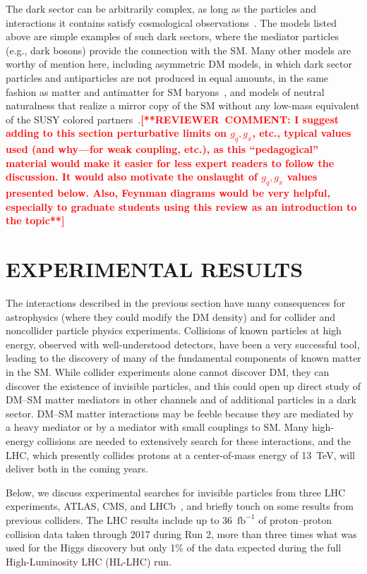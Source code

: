 \documentclass{ar-1col}
\newcommand{\IP}{invisible particle}
\newcommand{\ifb}{\ensuremath{\mathrm{fb}^{-1}}\xspace}
\begin{document}
The dark sector can be arbitrarily complex, as long as the
particles and interactions it contains satisfy cosmological
observations~\cite{Strassler:2006im, Evans:2017kti}. The models
listed above are simple examples of such dark sectors, where the
mediator particles (e.g., dark bosons) provide the connection with
the SM. Many other models are worthy of mention here, including
asymmetric DM models, in which dark sector particles and
antiparticles are not produced in equal amounts, in the same
fashion as matter and antimatter for SM
baryons~\cite{Zurek:2013wia}, and models of neutral
naturalness that realize a mirror copy of the SM without any
low-mass equivalent of the SUSY colored
partners~\cite{Craig:2014aea}.\textbf{\textcolor{red}{[**REVIEWER\ COMMENT: I suggest adding to this section perturbative limits on $g_q, g_x$, etc., typical values used (and why---for weak coupling, etc.), as this ``pedagogical'' material would make it easier for less expert readers to follow the discussion. It would also motivate the onslaught of $g_q, g_x$ values presented below. Also, Feynman diagrams would be very helpful, especially to graduate students using this review as an introduction to the topic**]}}

\section{EXPERIMENTAL RESULTS}\label{sec:03_ExperimentalResults}

The interactions described in the previous section have many
consequences for astrophysics (where they could modify the DM
density) and for collider and noncollider particle physics
experiments.
Collisions of known particles at high energy, observed with
well-understood detectors, have been a very successful tool,
leading to the discovery of many of the fundamental components of
known matter in the SM. While collider experiments alone cannot
discover DM, they can discover {the existence of \IP}s, and this could open up
direct study of DM--SM matter mediators in other channels and of
additional particles in a dark sector. DM--SM matter interactions may be
feeble because they are mediated by a heavy mediator or by a
mediator with small couplings to SM. Many high-energy collisions are needed to extensively search for these interactions, and the
LHC, which presently collides protons at a center-of-mass energy
of 13~TeV, will deliver both in the coming years.

Below, we discuss experimental searches for {\IP}s from three
LHC~\cite{LHC2008} experiments, ATLAS, CMS, and
LHCb~\cite{ATLAS2008,CMS2008,LHCb2008}, and briefly touch on some
results from previous colliders. The LHC results include up to
36~\ifb of proton--proton collision data taken through 2017 during Run 2,
more than three times what was used for the Higgs discovery but only
1\% of the data expected during the full High-Luminosity LHC (HL-LHC)
run.
\end{document}
